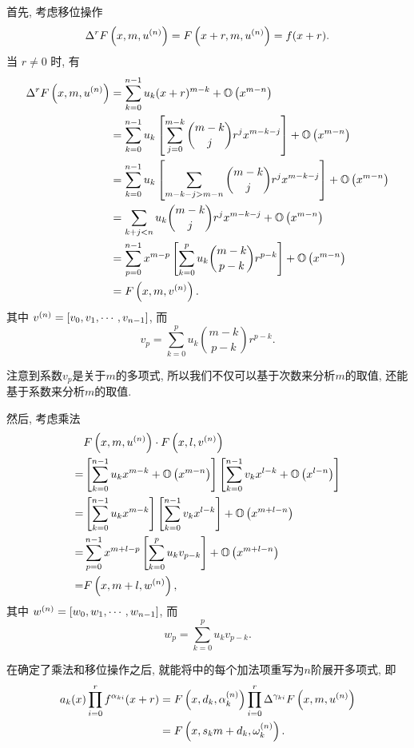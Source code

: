 首先, 考虑移位操作
\begin{equation}
\Delta^r F\left(x,m,u^{(n)}\right) = F\left(x+r,m,u^{(n)}\right) = f(x+r).
\end{equation}
当 $r\neq 0$ 时, 有 
\begin{equation} 
\begin{aligned}
\Delta^r F\left(x,m,u^{(n)}\right) &= \sum_{k=0}^{n-1}{u_k (x+r)^{m-k}}+\mathbb O\left(x^{m-n}\right) \\
&= \sum_{k=0}^{n-1}{u_k \left[\sum_{j=0}^{m-k}{\binom{m-k}{j}r^j x^{m-k-j}}\right]}+\mathbb O\left(x^{m-n}\right) \\
&= \sum_{k=0}^{n-1}{u_k \left[\sum_{m-k-j>m-n}{\binom{m-k}{j}r^j x^{m-k-j}}\right]}+\mathbb O\left(x^{m-n}\right) \\
&= \sum_{k+j<n}{u_k {\binom{m-k}{j}r^j x^{m-k-j}}}+\mathbb O\left(x^{m-n}\right) \\
&=\sum_{p=0}^{n-1}{x^{m-p}\left[\sum_{k=0}^p{u_k\binom{m-k}{p-k}r^{p-k}}\right]}+\mathbb O\left(x^{m-n}\right)\\
&=F\left(x,m,v^{(n)}\right).
\end{aligned} \label{NEM-shift}
\end{equation}
其中 $v^{(n)}=\left[v_0,v_1,\cdots,v_{n-1}\right]$, 而
\begin{equation}
v_p=\sum_{k=0}^p{u_k\binom{m-k}{p-k}r^{p-k}}.
\end{equation}

注意到系数$v_p$是关于$m$的多项式, 所以我们不仅可以基于次数来分析$m$的取值, 还能基于系数来分析$m$的取值. 

然后, 考虑乘法 
\begin{equation}
\begin{aligned}
& F\left(x,m,u ^{(n)}\right)\cdot F\left(x,l,v^{(n)}\right) \\
=& \left[\sum_{k=0}^{n-1}{u_k x^{m-k}}+\mathbb O\left(x^{m-n}\right)\right]\left[\sum_{k=0}^{n-1}{v_k x^{l-k}}+\mathbb O\left(x^{l-n}\right)\right] \\
=& \left[\sum_{k=0}^{n-1}{u_k x^{m-k}}\right]\left[\sum_{k=0}^{n-1}{v_k x^{l-k}}\right]+\mathbb O\left(x^{m+l-n}\right) \\
=& \sum_{p=0}^{n-1}{x^{m+l-p}\left[\sum_{k=0}^p{u_k v_{p-k}}\right]}+\mathbb O\left(x^{m+l-n}\right) \\
=& F\left(x,m+l,w^{(n)}\right) ,
\end{aligned} \label{NEM-times}
\end{equation}
其中 $w^{(n)}=\left[w_0,w_1,\cdots,w_{n-1}\right]$, 而
\begin{equation}
w_p=\sum_{k=0}^p{u_k v_{p-k}}.
\end{equation}

在确定了乘法和移位操作之后, 就能将中的每个加法项重写为$n$阶展开多项式, 即
\begin{equation}
\begin{aligned}
a_k(x)\prod_{i=0}^r{f^{\alpha_{ki}}(x+r)}&=F\left(x,d_k,\alpha_k^{(n)}\right)\prod_{i=0}^r{\Delta^{\gamma_{ki}}F\left(x,m,u^{(n)}\right)} \\
&= F\left(x,s_k m+d_k, \omega_k^{(n)}\right) .
\end{aligned}
\end{equation}

